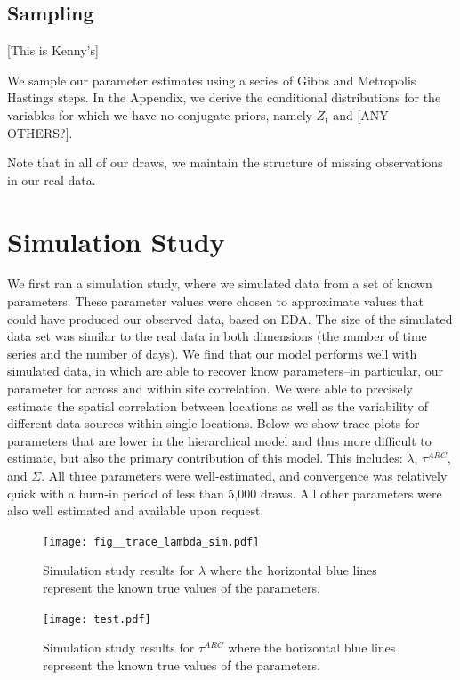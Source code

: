\documentclass[12pt]{article}
\begin{document}
\subsection{Sampling}
[This is Kenny's]

We sample our parameter estimates using a series of Gibbs and Metropolis Hastings steps. In the Appendix, we derive the conditional distributions for the variables for which we have no conjugate priors, namely $Z_t$ and [ANY OTHERS?]. 

Note that in all of our draws, we maintain the structure of missing observations in our real data. 

\section{Simulation Study}
\label{sec:sim}
We first ran a simulation study, where we simulated data from a set of known parameters. These parameter values were chosen to approximate values that could have produced our observed data, based on EDA. The size of the simulated data set was similar to the real data in both dimensions (the number of time series and the number of days). We find that our model performs well with simulated data, in which are able to recover know parameters--in particular, our parameter for across and within site correlation. We were able to precisely estimate the spatial correlation between locations as well as the variability of different data sources within single locations. Below we show trace plots for parameters that are lower in the hierarchical model and thus more difficult to estimate, but also the primary contribution of this model. This includes: $\lambda$, $\tau^{ARC}$, and $\Sigma$. All three parameters were well-estimated, and convergence was relatively quick with a burn-in period of less than 5,000 draws. All other parameters were also well estimated and available upon request. 


\begin{figure}[htbp]
\begin{center}
\caption{Simulation study results for $\lambda$ where the horizontal blue lines represent the known true values of the parameters.}
\texttt{[image: fig\_\_trace\_lambda\_sim.pdf]}
\end{center}
\end{figure}



\begin{figure}[p]
\caption{Simulation study results for $\tau^{ARC}$ where the horizontal blue lines represent the known true values of the parameters.}
 \begin{center}
\texttt{[image: test.pdf]}
\label{figure:figure1}
\end{center}
\end{figure}
\end{document}

